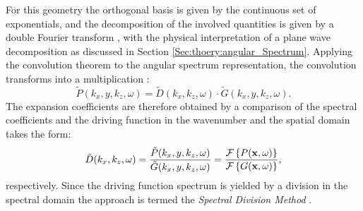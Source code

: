 For this geometry the orthogonal basis is given by the continuous set of exponentials, and the decomposition of the involved quantities is given by a double Fourier transform \cite{Arfken2005, Ahrens2012, Schultz2014:Comparing_approaches}, with the physical interpretation of a plane wave decomposition as discussed in Section \ref{Sec:thoery:angular_Spectrum}.
Applying the convolution theorem to the angular spectrum representation, the convolution transforms into a multiplication \cite{Girod2001}:
\begin{equation}
\tilde{P}(k_x,y,k_z, \omega) = \tilde{D}(k_x,k_z, \omega) \cdot \tilde{G}(k_x,y,k_z, \omega).
\end{equation}
%
The expansion coefficients are therefore obtained by a comparison of the spectral coefficients and the driving function in the wavenumber and the spatial domain takes the form:
\begin{equation}
\tilde{D}(k_x,k_z,\omega) = \frac{\tilde{P}(k_x,y,k_z, \omega)}{ \tilde{G}(k_x,y,k_z, \omega)} = 
\frac{\mathcal{F}\left\{ P(\mathbf{x},\omega) \right\} }
{  \mathcal{F}\left\{ G(\mathbf{x},\omega) \right\} },
\label{Eq:Theory:Dkxkz}
\end{equation}
respectively.
Since the driving function spectrum is yielded by a division in the spectral domain the approach is termed the \emph{Spectral Division Method} \cite{Ahrens2010a, Ahrens2011:icassp, Ahrens2010:Ambisonics_w_planar_linear, Ahrens2012:Ambisonics_for_planar_linear}.

